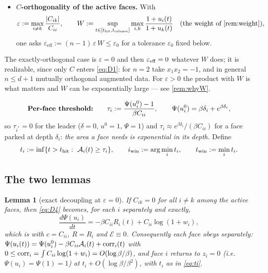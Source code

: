 \documentclass[11pt]{article}
\newtheorem{lemma}[theorem]{Lemma}
\theoremstyle{remark}
\newcommand{\thit}{t_{\mathrm{hit}}}
\newcommand{\trel}{t_{\mathrm{release}}}
\newcommand{\Ar}{\mathcal{A}}
\newcommand{\hyplabel}[1]{\textup{(#1)}}
\begin{document}
\begin{itemize}
\item[\hyplabel{H7}] \textbf{$C$-orthogonality of the active faces.} With
\[
\varepsilon:=\max_{i\ne k}\frac{|C_{ik}|}{C_{ii}},\qquad
W:=\sup_{t\in[\thit,\trel]}\max_{i,k}\frac{1+u_i(t)}{1+u_k(t)}
\quad(\text{the weight of \cref{rem:weight}}),
\]
one asks $\varepsilon_{\mathrm{eff}}:=(n-1)\,\varepsilon\,W\le\varepsilon_0$
for a tolerance $\varepsilon_0$ fixed below.
\end{itemize}

The exactly-orthogonal case is $\varepsilon=0$ and then $\varepsilon_{\rm
eff}=0$ whatever $W$ does; it is realizable, since only $C$ enters
\eqref{eq:D1}: for $n=2$ take $x_1x_2=-1$, and in general $n\le d+1$ mutually
orthogonal augmented data. For $\varepsilon>0$ the product with $W$ is what
matters and $W$ can be exponentially large --- see \cref{rem:whyW}.

\begin{equation}\label{eq:tau}
\text{\textbf{Per-face threshold:}}\qquad
\tau_i:=\frac{\Psi(u_i^0)-1}{\beta C_{ii}},
\qquad
\Psi(u_i^0)=\beta\delta_i+e^{\beta\delta_i},
\end{equation}
so $\tau_{i^\ast}=0$ for the leader ($\delta=0$, $u^0=1$, $\Psi=1$) and
$\tau_i\approx e^{\beta\delta_i}/(\beta C_{ii})$ for a face parked at depth
$\delta_i$: \emph{the area a face needs is exponential in its depth.} Define
\begin{equation}\label{eq:ti}
t_i:=\inf\{t>\thit:\ \Ar_i(t)\ge\tau_i\},\qquad
i_{\rm win}:=\arg\min_it_i,\qquad t_{\rm win}:=\min_it_i .
\end{equation}

\subsection{The two lemmas}

\begin{lemma}[exact decoupling at $\varepsilon=0$]\label{lem:B1}
If $C_{ik}=0$ for all $i\ne k$ among the active faces, then \eqref{eq:D4}
becomes, for each $i$ separately and \emph{exactly},
\begin{equation}\label{eq:Bdec}
\frac{d\Psi(u_i)}{dt}=-\beta C_{ii}R_i(t)+C_{ii}\log(1+w_i),
\end{equation}
which is \cite[eq.~(quadratureF)]{paper} with $c=C_{ii}$, $R=R_i$ and
$\mathcal E\equiv0$. Consequently each face obeys \cite[L4$'$]{paper}
separately: $\Psi(u_i(t))=\Psi(u_i^0)-\beta C_{ii}\Ar_i(t)+{\rm corr}_i(t)$ with
$0\le{\rm corr}_i=\int C_{ii}\log(1+w_i)=O(\log\beta/\beta)$, and face $i$
returns to $z_i=0$ (i.e.\ $\Psi(u_i)=\Psi(1)=1$) at
$t_i+O(\log\beta/\beta^{2})$, with $t_i$ as in \eqref{eq:ti}.
\end{lemma}
\end{document}
